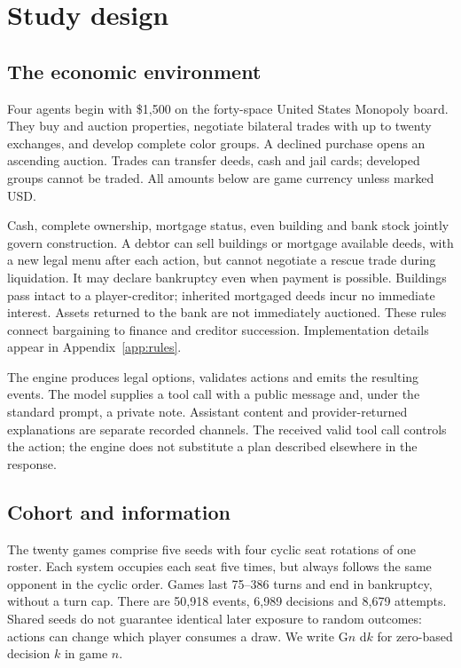 \section{Study design}
\label{sec:setup}

\subsection{The economic environment}
Four agents begin with \$1,500 on the forty-space United States Monopoly board. They buy and auction properties, negotiate bilateral trades with up to twenty exchanges, and develop complete color groups. A declined purchase opens an ascending auction. Trades can transfer deeds, cash and jail cards; developed groups cannot be traded. All amounts below are game currency unless marked USD.

Cash, complete ownership, mortgage status, even building and bank stock jointly govern construction. A debtor can sell buildings or mortgage available deeds, with a new legal menu after each action, but cannot negotiate a rescue trade during liquidation. It may declare bankruptcy even when payment is possible. Buildings pass intact to a player-creditor; inherited mortgaged deeds incur no immediate interest. Assets returned to the bank are not immediately auctioned. These rules connect bargaining to finance and creditor succession. Implementation details appear in Appendix~\ref{app:rules}.

The engine produces legal options, validates actions and emits the resulting events. The model supplies a tool call with a public message and, under the standard prompt, a private note. Assistant content and provider-returned explanations are separate recorded channels. The received valid tool call controls the action; the engine does not substitute a plan described elsewhere in the response.

\subsection{Cohort and information}
The twenty games comprise five seeds with four cyclic seat rotations of one roster. Each system occupies each seat five times, but always follows the same opponent in the cyclic order. Games last 75--386 turns and end in bankruptcy, without a turn cap. There are 50,918 events, 6,989 decisions and 8,679 attempts. Shared seeds do not guarantee identical later exposure to random outcomes: actions can change which player consumes a draw. We write G$n$ d$k$ for zero-based decision $k$ in game $n$.

